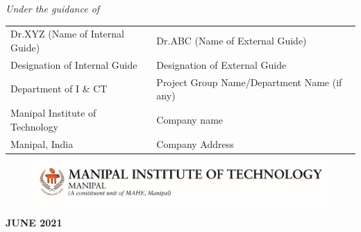 \documentclass[runningheads,a4paper,12pt]{report}
\renewcommand{\baselinestretch}{1.66}
\begin{document}
\begin{titlepage}
	\begin{center}
	\small{\textit{Under the guidance of}} \\
\renewcommand{\baselinestretch}{1}
\begin{table}[h]
	\centering
		\begin{tabular}{p{3in} p{3in}}
			Dr.XYZ (Name of Internal Guide) &  Dr.ABC (Name of External Guide)  \\
			Designation of Internal Guide &    Designation of External Guide \\
			Department of I \& CT  &  Project Group Name/Department Name (if any) \\
			 Manipal Institute of Technology& Company name \\
			Manipal, India &  Company Address 
		\end{tabular}
\end{table}
	\end{center}
	\begin{figure}[h]
  \begin{center}
	\includegraphics[scale=1]{MITLogo}
	\end{center}
	\end{figure}
	\begin{center}
	\textbf{JUNE 2021}
	\end{center}
\end{titlepage}

\setcounter{secnumdepth}{3}
\setcounter{tocdepth}{3}




 


\tableofcontents
\listoftables
{}
\listoffigures
{}










\addappheadtotoc
\appendixpage



\renewcommand{\bibname}{References} %

\rhead{}



\end{document}
